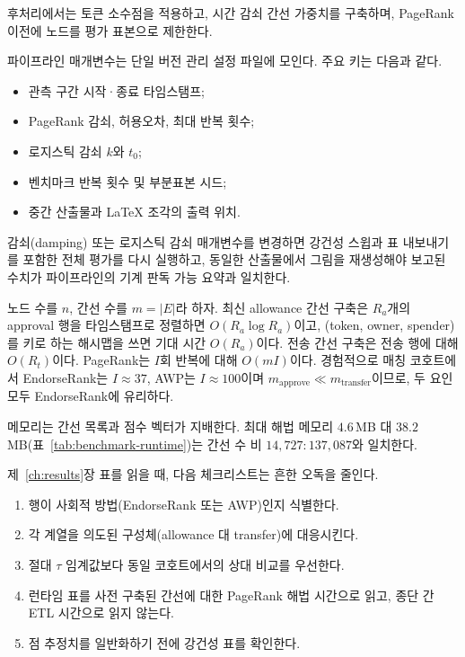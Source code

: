 후처리에서는 토큰 소수점을 적용하고, 시간 감쇠 간선 가중치를 구축하며, PageRank 이전에 노드를 평가 표본으로 제한한다.


파이프라인 매개변수는 단일 버전 관리 설정 파일에 모인다. 주요 키는 다음과 같다.

\begin{itemize}
\item 관측 구간 시작·종료 타임스탬프;
\item PageRank 감쇠, 허용오차, 최대 반복 횟수;
\item 로지스틱 감쇠 $k$와 $t_0$;
\item 벤치마크 반복 횟수 및 부분표본 시드;
\item 중간 산출물과 LaTeX 조각의 출력 위치.
\end{itemize}

감쇠(damping) 또는 로지스틱 감쇠 매개변수를 변경하면 강건성 스윕과 표 내보내기를 포함한 전체 평가를 다시 실행하고, 동일한 산출물에서 그림을 재생성해야 보고된 수치가 파이프라인의 기계 판독 가능 요약과 일치한다.


노드 수를 $n$, 간선 수를 $m=|E|$라 하자. 최신 allowance 간선 구축은 $R_a$개의 approval 행을 타임스탬프로 정렬하면 $O(R_a\log R_a)$이고, (token, owner, spender)를 키로 하는 해시맵을 쓰면 기대 시간 $O(R_a)$이다. 전송 간선 구축은 전송 행에 대해 $O(R_t)$이다. PageRank는 $I$회 반복에 대해 $O(mI)$이다. 경험적으로 매칭 코호트에서 EndorseRank는 $I\approx 37$, AWP는 $I\approx 100$이며 $m_{\mathrm{approve}}\ll m_{\mathrm{transfer}}$이므로, 두 요인 모두 EndorseRank에 유리하다.

메모리는 간선 목록과 점수 벡터가 지배한다. 최대 해법 메모리 $4.6$\,MB 대 $38.2$\,MB(표~\ref{tab:benchmark-runtime})는 간선 수 비 $14{,}727:137{,}087$와 일치한다.


제~\ref{ch:results}장 표를 읽을 때, 다음 체크리스트는 흔한 오독을 줄인다.

\begin{enumerate}
\item 행이 사회적 방법(EndorseRank 또는 AWP)인지 식별한다.
\item 각 계열을 의도된 구성체(allowance 대 transfer)에 대응시킨다.
\item 절대 $\tau$ 임계값보다 동일 코호트에서의 상대 비교를 우선한다.
\item 런타임 표를 사전 구축된 간선에 대한 PageRank 해법 시간으로 읽고, 종단 간 ETL 시간으로 읽지 않는다.
\item 점 추정치를 일반화하기 전에 강건성 표를 확인한다.
\end{enumerate}

